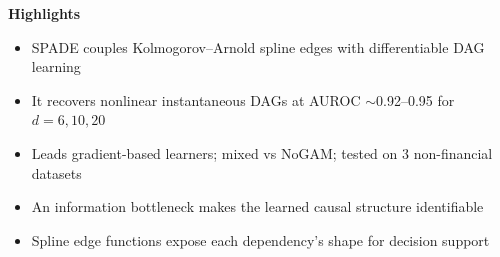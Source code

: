 \documentclass[11pt]{article}
\begin{document}
\begin{center}\Large\textbf{Highlights}\end{center}
\vspace{1em}

\begin{itemize}
\item SPADE couples Kolmogorov--Arnold spline edges with differentiable DAG learning
\item It recovers nonlinear instantaneous DAGs at AUROC $\sim$0.92--0.95 for $d=6,10,20$
\item Leads gradient-based learners; mixed vs NoGAM; tested on 3 non-financial datasets
\item An information bottleneck makes the learned causal structure identifiable
\item Spline edge functions expose each dependency's shape for decision support
\end{itemize}
\end{document}
